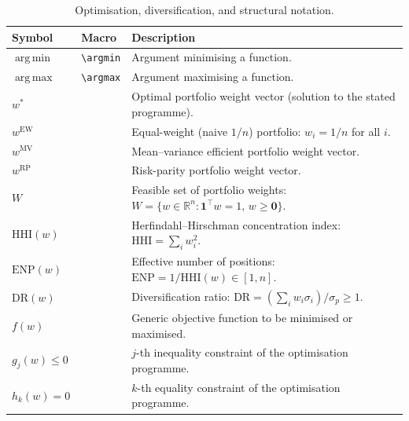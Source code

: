 \documentclass[12pt,openany]{book}
\newcommand{\R}{\mathbb{R}}
\newcommand{\bfw}{\mathbf{w}}
\newcommand{\bfone}{\mathbf{1}}
\DeclareMathOperator*{\argmin}{arg\,min}
\DeclareMathOperator*{\argmax}{arg\,max}
\newcommand{\bfzero}{\mathbf{0}}
\numberwithin{equation}{chapter}
\theoremstyle{plain}
\theoremstyle{definition}
\theoremstyle{remark}
\renewcommand{\arraystretch}{1.2}
\def\mathcal#1{#1}%
\def\bfw{w}%
\begin{document}
\begin{table}[H]
\renewcommand{\arraystretch}{1.35}
\caption{Optimisation, diversification, and structural notation.}
\label{tab:symbols-optim}
\begin{tabularx}{\linewidth}{@{} l l X @{}}
\toprule
\textbf{Symbol} & \textbf{Macro} & \textbf{Description} \\
\midrule
$\argmin$ & \texttt{\textbackslash argmin} &
  Argument minimising a function. \\
$\argmax$ & \texttt{\textbackslash argmax} &
  Argument maximising a function. \\
$\bfw^*$ & &
  Optimal portfolio weight vector (solution to the stated programme). \\
$\bfw^{\mathrm{EW}}$ & &
  Equal-weight (naive $1/n$) portfolio: $w_i=1/n$ for all $i$. \\
$\bfw^{\mathrm{MV}}$ & &
  Mean--variance efficient portfolio weight vector. \\
$\bfw^{\mathrm{RP}}$ & &
  Risk-parity portfolio weight vector. \\
$\mathcal{W}$ & &
  Feasible set of portfolio weights:
  $\mathcal{W}=\{\bfw\in\R^n:\bfone^\top\bfw=1,\,\bfw\geq\bfzero\}$. \\
$\mathrm{HHI}(\bfw)$ & &
  Herfindahl--Hirschman concentration index:
  $\mathrm{HHI}=\sum_i w_i^2$. \\
$\mathrm{ENP}(\bfw)$ & &
  Effective number of positions:
  $\mathrm{ENP}=1/\mathrm{HHI}(\bfw)\in[1,n]$. \\
$\mathrm{DR}(\bfw)$ & &
  Diversification ratio:
  $\mathrm{DR}=(\sum_i w_i\sigma_i)/\sigma_p\geq1$. \\
$f(\bfw)$ & &
  Generic objective function to be minimised or maximised. \\
$g_j(\bfw)\leq0$ & &
  $j$-th inequality constraint of the optimisation programme. \\
$h_k(\bfw)=0$ & &
  $k$-th equality constraint of the optimisation programme. \\
\bottomrule
\end{tabularx}
\end{table}
\end{document}
